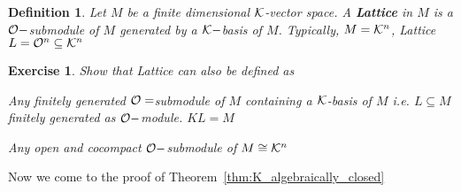 \documentclass[11pt]{article}
\newtheorem{exercise}[thm]{Exercise}
\newtheorem{dfn}[thm]{Definition}
\newcommand{\calk}{{\cal K}}
\newcommand{\calo}{{\cal O}}
\begin{document}
\begin{dfn}
Let $M$ be a finite dimensional $\calk$-vector space. A \textbf{Lattice} in $M$ is a $\calo-$submodule of $M$ generated by a $\calk-$basis of $M$. Typically, $M=\calk^n$, Lattice $L=\calo^n\subseteq \calk^n$
\end{dfn}

\begin{exercise}
Show that Lattice can also be defined as

Any finitely generated $\calo=$submodule of $M$ containing a $\calk$-basis of $M$ i.e. $L\subseteq M$ finitely generated as $\calo-$module. $KL=M$

Any open and cocompact $\calo-$submodule of $M\cong \calk^n$
\end{exercise}

Now we come to the proof of Theorem~\ref{thm:K_algebraically_closed}
\end{document}
